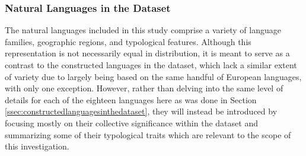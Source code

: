 \documentclass[12pt,a4paper]{article}
\numberwithin{figure}{section}
\numberwithin{table}{section}
\numberwithin{definition}{section}
\begin{document}



\subsubsection{Natural Languages in the Dataset}
\label{ssec:naturallanguagesinthedataset}

The natural languages included in this study comprise a variety of language families, geographic regions, and typological features. Although this representation is not necessarily equal in distribution, it is meant to serve as a contrast to the constructed languages in the dataset, which lack a similar extent of variety due to largely being based on the same handful of European languages, with only one exception. However, rather than delving into the same level of details for each of the eighteen languages here as was done in Section \ref{ssec:constructedlanguagesinthedataset}, they will instead be introduced by focusing mostly on their collective significance within the dataset and summarizing some of their typological traits which are relevant to the scope of this investigation.


\end{document}
